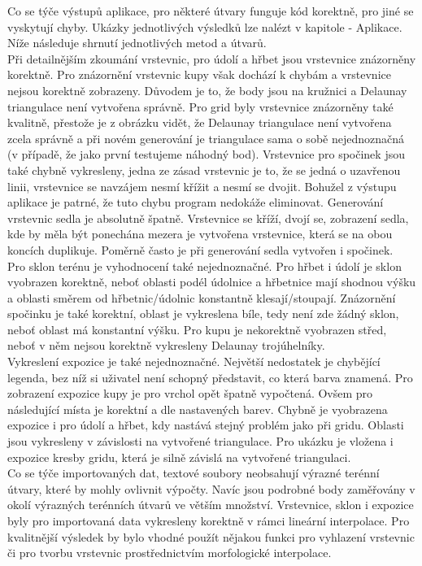 \documentclass[a4paper, 12pt]{article}
\begin{document}
Co se týče výstupů aplikace, pro některé útvary funguje kód korektně, pro jiné se vyskytují chyby. Ukázky jednotlivých výsledků lze nalézt v kapitole 
 - Aplikace. Níže následuje shrnutí jednotlivých metod a útvarů.\\

Při detailnějším zkoumání vrstevnic, pro údolí a hřbet jsou vrstevnice znázorněny korektně. Pro znázornění vrstevnic kupy však dochází k chybám a vrstevnice nejsou korektně zobrazeny. Důvodem je to, že body jsou na kružnici a Delaunay triangulace není vytvořena správně. Pro grid byly vrstevnice znázorněny také kvalitně, přestože je z obrázku vidět, že Delaunay triangulace není vytvořena zcela správně a při novém generování je triangulace sama o sobě nejednoznačná (v případě, že jako první testujeme náhodný bod). Vrstevnice pro spočinek jsou také chybně vykresleny, jedna ze zásad vrstevnic je to, že se jedná o uzavřenou linii, vrstevnice se navzájem nesmí křížit a nesmí se dvojit. Bohužel z výstupu aplikace je patrné, že tuto chybu program nedokáže eliminovat. Generování vrstevnic sedla je absolutně špatně. Vrstevnice se kříží, dvojí se, zobrazení sedla, kde by měla být ponechána mezera je vytvořena vrstevnice, která se na obou koncích duplikuje. Poměrně často je při generování sedla vytvořen i spočinek. \\

Pro sklon terénu je vyhodnocení také nejednoznačné. Pro hřbet i údolí je sklon vyobrazen korektně, neboť oblasti podél údolnice a hřbetnice mají shodnou výšku a oblasti směrem od hřbetnic/údolnic konstantně klesají/stoupají. Znázornění spočinku je také korektní, oblast je vykreslena bíle, tedy není zde žádný sklon, neboť oblast má konstantní výšku. Pro kupu je nekorektně vyobrazen střed, neboť v něm nejsou korektně vykresleny Delaunay trojúhelníky. \\

Vykreslení expozice je také nejednoznačné. Největší nedostatek je chybějící legenda, bez níž si uživatel není schopný představit, co která barva znamená. Pro zobrazení expozice kupy je pro vrchol opět špatně vypočtená. Ovšem pro následující místa je korektní a dle nastavených barev. Chybně je vyobrazena expozice i pro údolí a hřbet, kdy nastává stejný problém jako při gridu. Oblasti jsou vykresleny v závislosti na vytvořené triangulace. Pro ukázku je vložena i expozice kresby gridu, která je silně závislá na vytvořené triangulaci. \\

Co se týče importovaných dat, textové soubory neobsahují výrazné terénní útvary, které by mohly ovlivnit výpočty. Navíc jsou podrobné body zaměřovány v okolí výrazných terénních útvarů ve větším množství. Vrstevnice, sklon i expozice byly pro importovaná data vykresleny korektně v rámci lineární interpolace. Pro kvalitnější výsledek by bylo vhodné použít nějakou funkci pro vyhlazení vrstevnic či pro tvorbu vrstevnic prostřednictvím morfologické interpolace.
\end{document}
